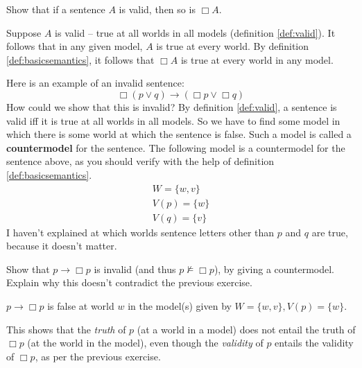 \begin{exercise}
  Show that if a sentence $A$ is valid, then so is $\Box A$.
\end{exercise}
\begin{solution}
  Suppose $A$ is valid -- true at all worlds in all models (definition
  \ref{def:valid}). It follows that in any given model, $A$ is true at every
  world. By definition \ref{def:basicsemantics}, it follows that $\Box A$ is
  true at every world in any model.
\end{solution}

Here is an example of an invalid sentence:
\[
  \Box(p \lor q) \to (\Box p \lor \Box q)
\]
How could we show that this is invalid? By definition \ref{def:valid}, a
sentence is valid iff it is true at all worlds in all models. So we have to find
some model in which there is some world at which the sentence is false. Such a
model is called a \textbf{countermodel} for the sentence. The following model is
a countermodel for the sentence above, as you should verify with the help of
definition \ref{def:basicsemantics}.
%
\begin{gather*}
  W = \{ w,v \}\\
  V(p) = \{ w \}\\
  V(q) = \{ v \}
\end{gather*}
%
I haven't explained at which worlds sentence letters other than $p$ and $q$ are
true, because it doesn't matter.


\begin{exercise}
  Show that $p \to \Box p$ is invalid (and thus $p \not\models \Box p$), by
  giving a countermodel. Explain why this doesn't contradict the previous
  exercise.
\end{exercise}
\begin{solution}
  $p\to \Box p$ is false at world $w$ in the model(s) given by
  $W = \{ w, v \}, V(p) = \{ w \}$.

  This shows that the \emph{truth} of $p$ (at a world in a model) does not
  entail the truth of $\Box p$ (at the world in the model), even though the
  \emph{validity} of $p$ entails the validity of $\Box p$, as per the previous
  exercise.
\end{solution}



